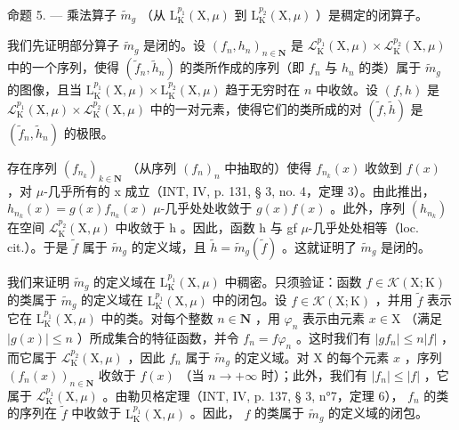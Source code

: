 命题 5. — 乘法算子 \(\widetilde{m}_{g}\) （从 \(\mathrm{L}_{\mathrm{K}}^{p_{1}}(\mathrm{X},\mu)\) 到 \(\mathrm{L}_{\mathrm{K}}^{p_{2}}(\mathrm{X},\mu)\) ）是稠定的闭算子。

我们先证明部分算子 \(\widetilde{m}_g\) 是闭的。设 \((f_n, h_n)_{n \in \mathbf{N}}\) 是 \(\mathcal{L}_{\mathrm{K}}^{p_1}(\mathrm{X}, \mu) \times \mathcal{L}_{\mathrm{K}}^{p_2}(\mathrm{X}, \mu)\) 中的一个序列，使得 \((\widetilde{f}_n, \widetilde{h}_n)\) 的类所作成的序列（即 \(f_n\) 与 \(h_n\) 的类）属于 \(\widetilde{m}_g\) 的图像，且当 \(\mathrm{L}_{\mathrm{K}}^{p_1}(\mathrm{X}, \mu) \times \mathrm{L}_{\mathrm{K}}^{p_2}(\mathrm{X}, \mu)\) 趋于无穷时在 \(n\) 中收敛。设 \((f, h)\) 是 \(\mathcal{L}_{\mathrm{K}}^{p_1}(\mathrm{X}, \mu) \times \mathcal{L}_{\mathrm{K}}^{p_2}(\mathrm{X}, \mu)\) 中的一对元素，使得它们的类所成的对 \((\widetilde{f}, \widetilde{h})\) 是 \((\widetilde{f}_n, \widetilde{h}_n)\) 的极限。

存在序列 \((f_{n_{k}})_{k\in\mathbf{N}}\) （从序列 \((f_{n})_{n}\) 中抽取的）使得 \(f_{n_{k}}(x)\) 收敛到 \(f(x)\) ，对 \(\mu\)-几乎所有的 x 成立（INT, IV, p. 131, § 3, no. 4，定理 3）。由此推出， \(h_{n_{k}}(x)=g(x)f_{n_{k}}(x)\) \(\mu\)-几乎处处收敛于 \(g(x)f(x)\) 。此外，序列 \((h_{n_{k}})\) 在空间 \(\mathcal{L}_{\mathrm{K}}^{p_{2}}(\mathrm{X},\mu)\) 中收敛于 h 。因此，函数 h 与 gf \(\mu\)-几乎处处相等（loc. cit.）。于是 \(\widetilde{f}\) 属于 \(\widetilde{m}_{g}\) 的定义域，且 \(\widetilde{h}=\widetilde{m}_{g}(\widetilde{f})\) 。这就证明了 \(\widetilde{m}_{g}\) 是闭的。

我们来证明 \(\widetilde{m}_g\) 的定义域在 \(\mathrm{L}_{\mathrm{K}}^{p_1}(\mathrm{X},\mu)\) 中稠密。只须验证：函数 \(f\in \mathcal{K}(\mathrm{X};\mathrm{K})\) 的类属于 \(\widetilde{m}_g\) 的定义域在 \(\mathrm{L}_{\mathrm{K}}^{p_1}(\mathrm{X},\mu)\) 中的闭包。设 \(f\in \mathcal{K}(\mathrm{X};\mathrm{K})\) ，并用 \(\widetilde{f}\) 表示它在 \(\mathrm{L}_{\mathrm{K}}^{p_1}(\mathrm{X},\mu)\) 中的类。对每个整数 \(n\in \mathbf{N}\) ，用 \(\varphi_{n}\) 表示由元素 \(x\in \mathrm{X}\) （满足 \(|g(x)|\leqslant n\) ）所成集合的特征函数，并令 \(f_{n} = f\varphi_{n}\) 。这时我们有 \(|gf_n|\leqslant n|f|\) ，而它属于 \(\mathcal{L}_{\mathrm{K}}^{p_2}(\mathrm{X},\mu)\) ，因此 \(f_{n}\) 属于 \(\widetilde{m}_g\) 的定义域。对 X 的每个元素 \(x\) ，序列 \((f_n(x))_{n\in \mathbf{N}}\) 收敛于 \(f(x)\) （当 \(n\to +\infty\) 时）；此外，我们有 \(|f_n|\leqslant |f|\) ，它属于 \(\mathcal{L}_{\mathrm{K}}^{p_1}(\mathrm{X},\mu)\) 。由勒贝格定理（INT, IV, p. 137, § 3, n°7，定理 6）， \(f_{n}\) 的类的序列在 \(\widetilde{f}\) 中收敛于 \(\mathrm{L}_{\mathrm{K}}^{p_1}(\mathrm{X},\mu)\) 。因此， \(f\) 的类属于 \(\widetilde{m}_g\) 的定义域的闭包。

